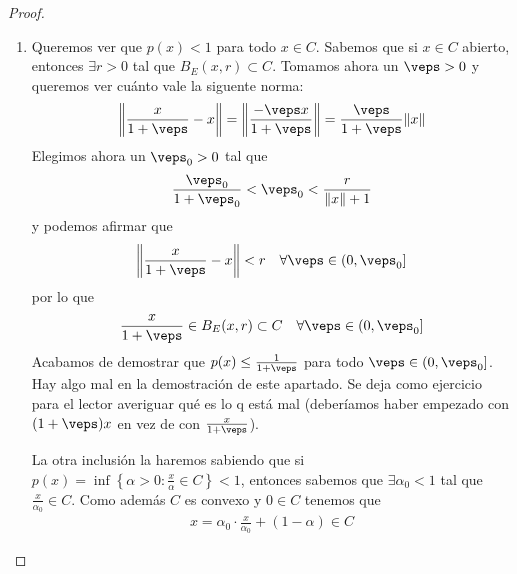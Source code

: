 \begin{propiedades}
\begin{proof}
\begin{enumerate}
            \item Queremos ver que $p(x)<1$ para todo $x\in C$. Sabemos que si $x\in C$ abierto, entonces $\exists r>0$ tal que $B_E(x,r)\subset C$. Tomamos ahora un $\veps>0$ y queremos ver cuánto vale la siguente norma:
            \begin{gather*}
                \left\| \frac{x}{1+\veps} - x\right\| = \left\| \frac{-\veps x}{1+\veps}\right\| = \frac{\veps}{1+\veps} \|x\|
            \end{gather*}
            Elegimos ahora un $\veps_0>0$ tal que 
            \begin{gather*}
                \frac{\veps_0}{1+\veps_0} < \veps_0 < \frac{r}{\|x\| + 1}
            \end{gather*}
            y podemos afirmar que 
            \begin{gather*}
                \left\| \frac{x}{1+\veps} - x\right\| < r \ \ \ \forall \veps \in (0,\veps_0]
            \end{gather*}
            por lo que 
            \begin{gather*}
                \frac{x}{1+\veps} \in B_E(x,r)\subset C \ \ \ \forall \veps \in (0,\veps_0]
            \end{gather*}
            Acabamos de demostrar que $p(x)\leq \frac{1}{1+\veps}$ para todo $\veps\in (0,\veps_0]$. Hay algo mal en la demostración de este apartado. Se deja como ejercicio para el lector averiguar qué es lo q está mal (deberíamos haber empezado con $(1+\veps)x$ en vez de con $\frac{x}{1+\veps}$).

            La otra inclusión la haremos sabiendo que si $p(x)=\inf\left\{ \alpha >0 : \frac{x}{\alpha}\in C\right\}<1$, entonces sabemos que $\exists \alpha_0<1$ tal que $\frac{x}{\alpha_0}\in C$. Como además $C$ es convexo y $0\in C$ tenemos que
            \begin{gather*}
                x=\alpha_0 \cdot \frac{x}{\alpha_0} + (1-\alpha) \in C
            \end{gather*}



\end{enumerate}
\end{proof}
\end{propiedades}
